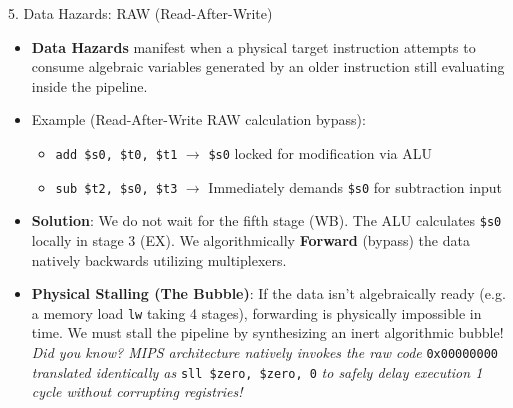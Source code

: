 \documentclass[aspectratio=169]{beamer}
\begin{document}
\begin{frame}{5. Data Hazards: RAW (Read-After-Write)}
\begin{itemize}
    \item \textbf{Data Hazards} manifest when a physical target instruction attempts to consume algebraic variables generated by an older instruction still evaluating inside the pipeline.
    \item Example (Read-After-Write RAW calculation bypass):
    \begin{itemize}
        \item \texttt{add \$s0, \$t0, \$t1} $\to$ \texttt{\$s0} locked for modification via ALU
        \item \texttt{sub \$t2, \$s0, \$t3} $\to$ Immediately demands \texttt{\$s0} for subtraction input
    \end{itemize}
    \item \textbf{Solution}: We do not wait for the fifth stage (WB). The ALU calculates \texttt{\$s0} locally in stage 3 (EX). We algorithmically \textbf{Forward} (bypass) the data natively backwards utilizing multiplexers.
    \item \textbf{Physical Stalling (The Bubble)}: If the data isn't algebraically ready (e.g. a memory load \texttt{lw} taking 4 stages), forwarding is physically impossible in time. We must stall the pipeline by synthesizing an inert algorithmic bubble! \textit{Did you know? MIPS architecture natively invokes the raw code} \texttt{0x00000000} \textit{translated identically as} \texttt{sll \$zero, \$zero, 0} \textit{to safely delay execution 1 cycle without corrupting registries!}
\end{itemize}
\end{frame}
\end{document}
